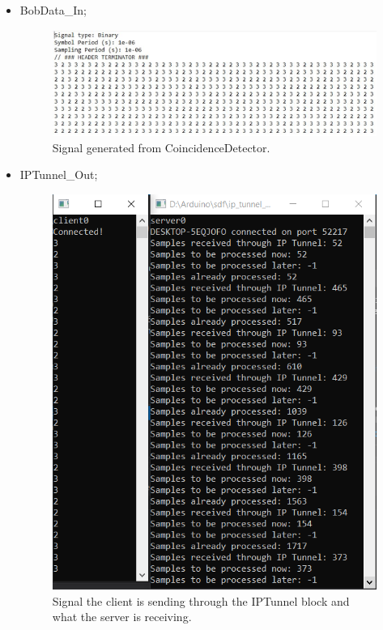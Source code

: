 \begin{refsection}
\begin{itemize}
	\item BobData\_In;
	\begin{figure}[H]
		\centering
		\includegraphics[width=1.1\linewidth]{./sdf/arduino_quantum_rx/figures/BobdataIn.JPG}
		\caption{Signal generated from CoincidenceDetector.}
		\label{fig:arduino}
	\end{figure}
	\clearpage
		\item IPTunnel\_Out;
	\begin{figure}[H]
		\centering
		\includegraphics[width=0.8\linewidth]{./sdf/arduino_quantum_rx/figures/Iptunnel.JPG}
		\caption{Signal the client is sending through the IPTunnel block and what the server is receiving.}
		\label{fig:arduino}
	\end{figure}



\end{itemize}
\end{refsection}
